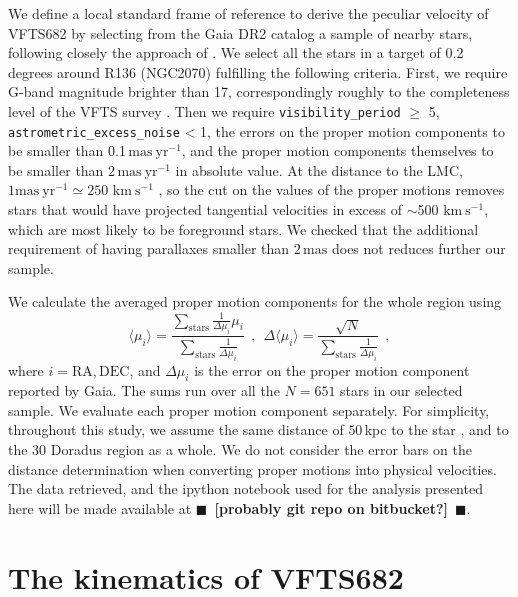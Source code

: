 \documentclass[apjl,twocolumn]{emulateapj}
\newcommand{\todo}[1]{{\large $\blacksquare$~\textbf{\color{red}[#1]}}~$\blacksquare$}
\newcommand{\SdM}[1]{{{\color{Sepia}{#1}}}}
\renewcommand{\SdM}[1]{{{{#1}}}}
\newcommand{\kms}{{\,\mathrm{km\ s^{-1}}}}
\begin{document}
We define a local standard frame \SdM{of reference} to derive the peculiar velocity
of VFTS682 by selecting from the Gaia DR2 catalog a sample of nearby
stars, following closely the approach of \cite{lennon:18}.
We select all the stars in a target of 0.2 degrees around R136
(NGC2070) fulfilling the following criteria. First, we require G-band
magnitude brighter than 17, correspondingly roughly to the
completeness level of the VFTS survey \citep[here we implicitly assume
G$\sim$V,][]{evans:11}. Then we require \texttt{visibility\_period} $\geq$ 5,
\texttt{astrometric\_excess\_noise} < 1, the errors on the proper
motion components to be smaller than 0.1\,$\mathrm{mas\ yr^{-1}}$,
and the proper motion components themselves to be smaller than
2\,$\mathrm{mas\ yr^{-1}}$ in absolute value. At the distance to the
LMC, $1\mathrm{mas\ yr^{-1}}\simeq250\,\kms$ \citep[e.g.,][]{lennon:18}, so the cut on the values
of the proper motions removes stars that would have projected
tangential velocities in excess of $\sim$500\,$\kms$, which are most
likely to be foreground stars. We checked that the additional
requirement of having parallaxes smaller than $2\,\mathrm{mas}$ does
not reduces further our sample. 

We calculate the averaged proper motion components for the whole
region using 
\begin{equation}
  \label{eq:mean}
  \langle \mu_i\rangle = \frac{\sum_\mathrm{stars}\frac{1}{\Delta
      \mu_i}\mu_i}{\sum_\mathrm{stars} \frac{1}{\Delta \mu_i}} \ \ , \
  \ \Delta \langle \mu_i\rangle = \frac{\sqrt{N}}{\sum_\mathrm{stars}
    \frac{1}{\Delta \mu_i}} \ \ ,
\end{equation}
where $i = \mathrm{RA}, \mathrm{DEC}$, and $\Delta \mu_i$ is the error
on the proper motion component reported by Gaia. The sums run over
all the $N=651$ stars in our selected sample. We evaluate each proper motion
component separately. For simplicity, throughout this study, we assume the same
distance of $50$\,kpc to the star \citep[][]{lebouteiller:08}, and to
the 30 Doradus region as a whole. We do not consider the error bars on
the distance determination when converting proper motions into
physical velocities. The data retrieved, and the ipython notebook used for the analysis
presented here will be made available at \todo{probably git repo on bitbucket?}. 

\section{The kinematics of VFTS682}
\label{sec:results}
\end{document}
